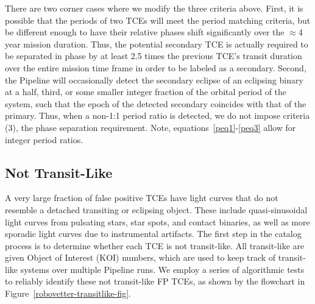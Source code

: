There are two corner cases where we modify the three criteria above. First, it is possible that the periods of two TCEs will meet the period matching criteria, but be different enough to have their relative phases shift significantly over the $\approx$4 year mission duration. Thus, the potential secondary TCE is actually required to be separated in phase by at least 2.5 times the previous TCE's transit duration over the entire mission time frame in order to be labeled as a secondary. Second, the \kepler{} Pipeline will occasionally detect the secondary eclipse of an eclipsing binary at a half, third, or some smaller integer fraction of the orbital period of the system, such that the epoch of the detected secondary coincides with that of the primary. Thus, when a non-1:1 period ratio is detected, we do not impose criteria (3), the phase separation requirement. Note, equations~\ref{peq1}-\ref{peq3} allow for integer period ratios.



\subsection{Not Transit-Like}
\label{nottransitlikesec}

A very large fraction of false positive TCEs have light curves that do not resemble a detached transiting or eclipsing object. These include quasi-sinusoidal light curves from pulsating stars, star spots, and contact binaries, as well as more sporadic light curves due to instrumental artifacts. The first step in the catalog process is to determine whether each TCE is not transit-like. All transit-like  are given \kepler{} Object of Interest (KOI) numbers, which are used to keep track of transit-like systems over multiple \kepler{} Pipeline runs. We employ a series of algorithmic tests to reliably identify these not transit-like FP TCEs, as shown by the flowchart in Figure~\ref{robovetter-transitlike-fig}.


